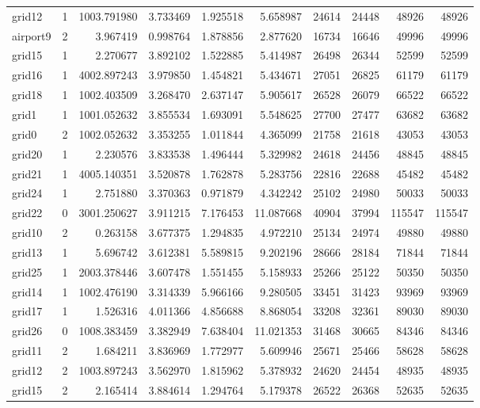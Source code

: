 \begin{longtable}{|l|r|r|r|r|r|r|r|r|r|}
grid12 & 1 & 1003.791980 & 3.733469 & 1.925518 & 5.658987 & 24614 & 24448 & 48926 & 48926 \\
airport9 & 2 & 3.967419 & 0.998764 & 1.878856 & 2.877620 & 16734 & 16646 & 49996 & 49996 \\
grid15 & 1 & 2.270677 & 3.892102 & 1.522885 & 5.414987 & 26498 & 26344 & 52599 & 52599 \\
grid16 & 1 & 4002.897243 & 3.979850 & 1.454821 & 5.434671 & 27051 & 26825 & 61179 & 61179 \\
grid18 & 1 & 1002.403509 & 3.268470 & 2.637147 & 5.905617 & 26528 & 26079 & 66522 & 66522 \\
grid1 & 1 & 1001.052632 & 3.855534 & 1.693091 & 5.548625 & 27700 & 27477 & 63682 & 63682 \\
grid0 & 2 & 1002.052632 & 3.353255 & 1.011844 & 4.365099 & 21758 & 21618 & 43053 & 43053 \\
grid20 & 1 & 2.230576 & 3.833538 & 1.496444 & 5.329982 & 24618 & 24456 & 48845 & 48845 \\
grid21 & 1 & 4005.140351 & 3.520878 & 1.762878 & 5.283756 & 22816 & 22688 & 45482 & 45482 \\
grid24 & 1 & 2.751880 & 3.370363 & 0.971879 & 4.342242 & 25102 & 24980 & 50033 & 50033 \\
grid22 & 0 & 3001.250627 & 3.911215 & 7.176453 & 11.087668 & 40904 & 37994 & 115547 & 115547 \\
grid10 & 2 & 0.263158 & 3.677375 & 1.294835 & 4.972210 & 25134 & 24974 & 49880 & 49880 \\
grid13 & 1 & 5.696742 & 3.612381 & 5.589815 & 9.202196 & 28666 & 28184 & 71844 & 71844 \\
grid25 & 1 & 2003.378446 & 3.607478 & 1.551455 & 5.158933 & 25266 & 25122 & 50350 & 50350 \\
grid14 & 1 & 1002.476190 & 3.314339 & 5.966166 & 9.280505 & 33451 & 31423 & 93969 & 93969 \\
grid17 & 1 & 1.526316 & 4.011366 & 4.856688 & 8.868054 & 33208 & 32361 & 89030 & 89030 \\
grid26 & 0 & 1008.383459 & 3.382949 & 7.638404 & 11.021353 & 31468 & 30665 & 84346 & 84346 \\
grid11 & 2 & 1.684211 & 3.836969 & 1.772977 & 5.609946 & 25671 & 25466 & 58628 & 58628 \\
grid12 & 2 & 1003.897243 & 3.562970 & 1.815962 & 5.378932 & 24620 & 24454 & 48935 & 48935 \\
grid15 & 2 & 2.165414 & 3.884614 & 1.294764 & 5.179378 & 26522 & 26368 & 52635 & 52635 \\

\end{longtable}
